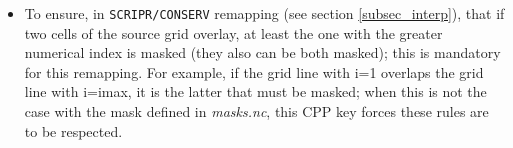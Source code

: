 \begin{itemize}





  
\item To ensure, in {\tt SCRIPR/CONSERV} remapping (see section
  \ref{subsec_interp}), that if two cells of the source grid overlay,
  at least the one with the greater numerical index is masked (they
  also can be both masked); this is mandatory for this remapping. For
  example, if the grid line with i=1 overlaps the grid line with
  i=imax, it is the latter that must be masked; when this is not the
  case with the mask defined in {\it masks.nc}, this CPP key forces
  these rules are to be respected.


\end{itemize}
